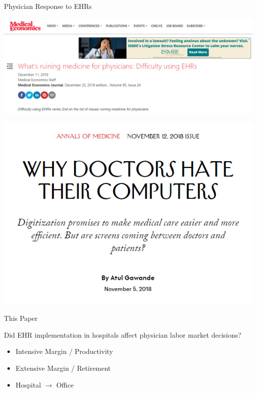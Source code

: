 \documentclass[10pt]{beamer}
\begin{document}
\begin{frame}{Physician Response to EHRs}
\begin{center}
    \includegraphics[scale=.3]{graphics/News Clip3.PNG}
    
    \vspace{3mm}
    
    \includegraphics[scale=.3]{graphics/News Clip2.PNG}
\end{center}

\end{frame}


\begin{frame}{This Paper}

Did EHR implementation in hospitals affect physician labor market decisions?
\begin{itemize}
    \item Intensive Margin / Productivity
    \item Extensive Margin / Retirement
    \item Hospital $\rightarrow$ Office
\end{itemize}

\end{frame}
\end{document}
